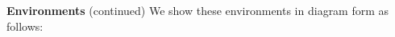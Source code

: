 \begin{minipage}[t]{\sw}
\slidenumber
\LARGE
{\bf Environments} (continued)\exx
We show these environments in diagram form as follows:\exx

\centerline{}

\end{minipage}
\clearpage

